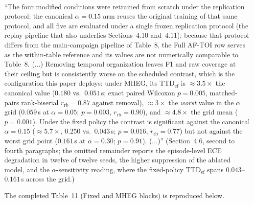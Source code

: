 \documentclass[1p,12pt,authoryear]{elsarticle}
\begin{document}
~

``The four modified conditions were retrained from scratch under the replication protocol; the canonical $\alpha{=}0.15$ arm reuses the original training of that same protocol, and all five are evaluated under a single frozen replication protocol (the replay pipeline that also underlies Sections~4.10 and~4.11); because that protocol differs from the main-campaign pipeline of Table~8, the Full AF-TOI row serves as the within-table reference and its values are not numerically comparable to Table~8. (...) Removing temporal organization leaves F1 and raw coverage at their ceiling but is consistently worse on the scheduled contrast, which is the configuration this paper deploys: under MHEG, its $\mathrm{TTD}_{\mathrm{ef}}$ is ${\approx}3.5\times$ the canonical value ($0.180$ vs.\ $0.051$\,s; exact paired Wilcoxon $p=0.005$, matched-pairs rank-biserial $r_{\mathrm{rb}}=0.87$ against removal), ${\approx}3\times$ the \emph{worst} value in the $\alpha$ grid ($0.059$\,s at $\alpha=0.05$; $p=0.003$, $r_{\mathrm{rb}}=0.90$), and ${\approx}4.8\times$ the grid mean ($p=0.001$). Under the fixed policy the contrast is significant against the canonical $\alpha=0.15$ (${\approx}5.7\times$, $0.250$ vs.\ $0.043$\,s; $p=0.016$, $r_{\mathrm{rb}}=0.77$) but not against the worst grid point ($0.161$\,s at $\alpha=0.30$; $p=0.91$). (...)'' (Section~4.6, second to fourth paragraphs; the omitted remainder reports the episode-level ECE degradation in twelve of twelve seeds, the higher suppression of the ablated model, and the $\alpha$-sensitivity reading, where the fixed-policy $\mathrm{TTD}_{\mathrm{ef}}$ spans $0.043$--$0.161$\,s across the grid.)

\noindent The completed Table~11 (Fixed and MHEG blocks) is reproduced below.
\end{document}
